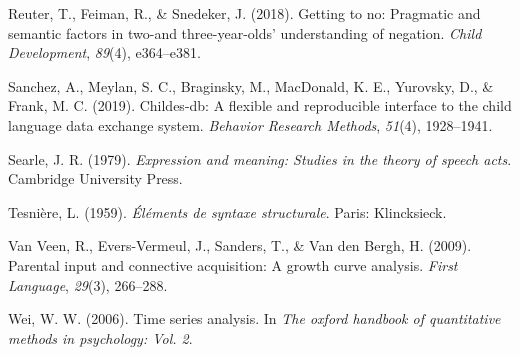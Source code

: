 \documentclass[
  man,floatsintext]{apa6}
\newlength{\cslhangindent}
\newenvironment{CSLReferences}[2] %
 {\begin{list}{}{%
  \setlength{\itemindent}{0pt}
  \setlength{\leftmargin}{0pt}
  \setlength{\parsep}{0pt}
  \ifodd #1
   \setlength{\leftmargin}{\cslhangindent}
   \setlength{\itemindent}{-1\cslhangindent}
  \fi
  \setlength{\itemsep}{#2\baselineskip}}}
 {\end{list}}
\begin{document}
\begin{CSLReferences}{1}{0}
Reuter, T., Feiman, R., \& Snedeker, J. (2018). Getting to no: Pragmatic and semantic factors in two-and three-year-olds' understanding of negation. \emph{Child Development}, \emph{89}(4), e364--e381.

Sanchez, A., Meylan, S. C., Braginsky, M., MacDonald, K. E., Yurovsky, D., \& Frank, M. C. (2019). Childes-db: A flexible and reproducible interface to the child language data exchange system. \emph{Behavior Research Methods}, \emph{51}(4), 1928--1941.

Searle, J. R. (1979). \emph{Expression and meaning: Studies in the theory of speech acts}. Cambridge University Press.

Tesnière, L. (1959). \emph{{É}l{é}ments de syntaxe structurale}. Paris: Klincksieck.

Van Veen, R., Evers-Vermeul, J., Sanders, T., \& Van den Bergh, H. (2009). Parental input and connective acquisition: A growth curve analysis. \emph{First Language}, \emph{29}(3), 266--288.

Wei, W. W. (2006). Time series analysis. In \emph{The oxford handbook of quantitative methods in psychology: Vol. 2}.

\end{CSLReferences}
\end{document}
